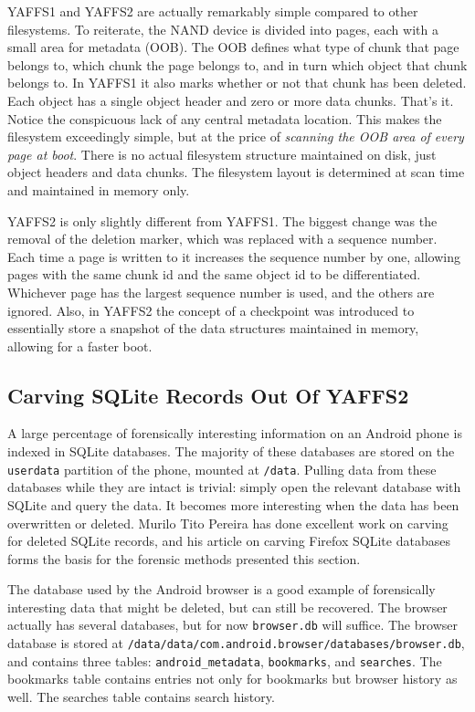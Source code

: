 YAFFS1 and YAFFS2 are actually remarkably simple compared to other filesystems. To reiterate, the NAND device is divided into
pages, each with a small area for metadata (OOB).  The OOB defines what type of chunk that page belongs to, which chunk the page
belongs to, and in turn which object that chunk belongs to.  In YAFFS1 it also marks whether or not that chunk has been deleted.
Each object has a single object header and zero or more data chunks.  That's it.  Notice the conspicuous lack of any central
metadata location.  This makes the filesystem exceedingly simple, but at the price of \emph{scanning the OOB area of every page at
boot}.  There is no actual filesystem structure maintained on disk, just object headers and data chunks.  The filesystem layout is
determined at scan time and maintained in memory only. 

YAFFS2 is only slightly different from YAFFS1. The biggest change was the removal of the deletion marker, which was replaced with a
sequence number. Each time a page is written to it increases the sequence number by one, allowing pages with the same chunk id and
the same object id to be differentiated.  Whichever page has the largest sequence number is used, and the others are ignored.  Also,
in YAFFS2 the concept of a checkpoint was introduced to essentially store a snapshot of the data structures maintained in memory,
allowing for a faster boot.

\subsection{Carving SQLite Records Out Of YAFFS2} A large percentage of forensically interesting information on an Android phone is
indexed in SQLite databases.  The majority of these databases are stored on the \texttt{userdata} partition of the phone, mounted at
\texttt{/data}.  Pulling data from these databases while they are intact is trivial: simply open the relevant database with SQLite
and query the data.  It becomes more interesting when the data has been overwritten or deleted.  Murilo Tito Pereira has done
excellent work on carving for deleted SQLite records, and his article on carving Firefox SQLite databases forms the basis for the
forensic methods presented this section.  \cite{carvefirefox}

The database used by the Android browser is a good example of forensically interesting data that might be deleted, but can still be
recovered. The browser actually has several databases, but for now \texttt{browser.db} will suffice. The browser database is stored
at \texttt{/data/data/com.android.browser/databases/browser.db}, and contains three tables: \texttt{android\_metadata},
\texttt{bookmarks}, and \texttt{searches}.  The bookmarks table contains entries not only for bookmarks but browser history as well.
The searches table contains search history. 

